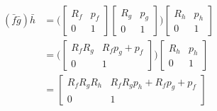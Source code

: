 \documentclass[12pt]{article}
\begin{document}
\begin{enumerate}
\begin{enumerate}
                        \begin{align} 
                            (\bar{f}\bar{g})\bar{h} &= \big(\begin{bmatrix} 
                                                            R_f & p_f \\ 
                                                            0 & 1
                                                        \end{bmatrix}
                                                        \begin{bmatrix} 
                                                            R_g & p_g \\ 
                                                            0 & 1
                                                        \end{bmatrix}\big)
                                                        \begin{bmatrix} 
                                                            R_h & p_h \\ 
                                                            0 & 1
                                                        \end{bmatrix}\\
                                                    &= \big(\begin{bmatrix}
                                                                R_f R_g & R_f p_g + p_f\\ 
                                                                0 & 1
                                                            \end{bmatrix}\big)
                                                        \begin{bmatrix} 
                                                            R_h & p_h \\ 
                                                            0 & 1
                                                        \end{bmatrix}\\
                                                    &= \begin{bmatrix}
                                                                R_f R_g R_h & R_f R_g p_h + R_f p_g + p_f\\ 
                                                                0 & 1
                                                        \end{bmatrix}
                        \end{align}
                        

\end{enumerate}
\end{enumerate}
\end{document}
